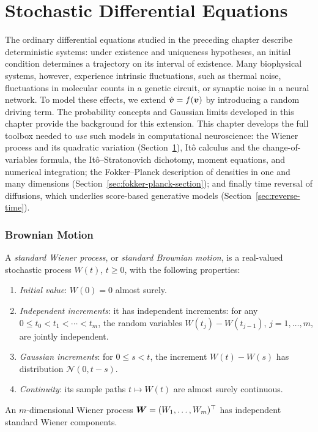 \chapter{Stochastic Differential Equations}
\label{sec:stochastic-differential-equations}

The ordinary differential equations studied in the preceding chapter describe deterministic systems: under existence and uniqueness hypotheses, 
an initial condition determines a trajectory on its interval of existence. Many biophysical systems, however, experience intrinsic fluctuations, 
such as thermal noise, fluctuations in molecular counts in a genetic circuit, or synaptic noise in a neural network. To model these effects, we 
extend $\dot{\bm{v}}=f(\bm{v})$ by introducing a random driving term. The probability concepts and Gaussian limits developed in this chapter provide 
the background for this extension. This chapter develops the full toolbox needed to \emph{use} such models in computational neuroscience: the 
Wiener process and its quadratic variation (Section~\ref{sec:stochastic-differential-equations}), It\^o calculus and the change-of-variables 
formula, the It\^o--Stratonovich dichotomy, moment equations, and numerical integration; the Fokker--Planck description of densities in one and 
many dimensions (Section~\ref{sec:fokker-planck-section}); and finally time reversal of diffusions, which underlies score-based generative models 
(Section~\ref{sec:reverse-time}).

\subsection{Brownian Motion}

\begin{definition}
\label{def:wiener-process}
A \emph{standard Wiener process}, or \emph{standard Brownian motion}, is a real-valued stochastic process $W(t)$, $t\ge0$, with the following 
properties:
\begin{enumerate}
\item \textit{Initial value}: $W(0)=0$ almost surely.
\item \textit{Independent increments}: it has independent increments: for any $0\leq t_0<t_1<\cdots<t_m$, the random variables $W(t_j)-W(t_{j-1})$, $j=1,\dots,m$, are jointly independent.
\item \textit{Gaussian increments}: for $0\leq s<t$, the increment $W(t)-W(s)$ has distribution $\mathcal{N}(0,t-s)$.
\item \textit{Continuity}: its sample paths $t\mapsto W(t)$ are almost surely continuous.
\end{enumerate}
An $m$-dimensional Wiener process $\bm{W}=(W_1,\dots,W_m)^{\top}$ has independent standard Wiener components.
\end{definition}

